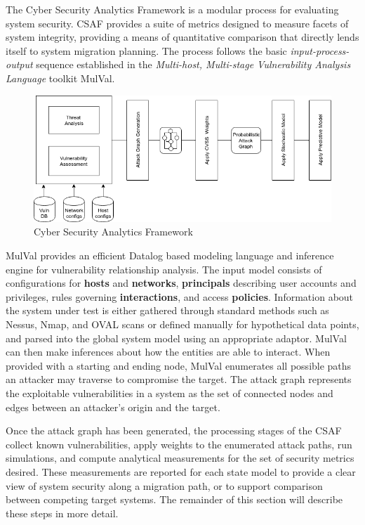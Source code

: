 
The Cyber Security Analytics Framework\cite{Abraham_2016} is a modular process for evaluating system security. CSAF provides a suite of metrics designed to measure facets of system integrity, providing a means of quantitative comparison that directly lends itself to system migration planning. The process follows the basic \textit{input-process-output} sequence established in the \textit{Multi-host, Multi-stage Vulnerability Analysis Language}\cite{Ou_Appel_2005} toolkit MulVal.

\begin{figure}[H]
\centering
\includegraphics[width=140mm]{resource/img/ch_background/sdn_analytics/CSAF_arch.png}
\caption{Cyber Security Analytics Framework\cite{Abraham_2016}}
\label{fig:csaf_framework}
\end{figure} 

MulVal provides an efficient\cite{Rao_1997} Datalog based modeling language and inference engine for vulnerability relationship analysis. The input model consists of configurations for \textbf{hosts} and \textbf{networks}, \textbf{principals} describing user accounts and privileges, rules governing \textbf{interactions}, and access \textbf{policies}. Information about the system under test is either gathered through standard methods\cite{Ou_Govindavajhala_Appel} such as Nessus, Nmap, and OVAL scans or defined manually for hypothetical data points, and parsed into the global system model using an appropriate adaptor. MulVal can then make inferences about how the entities are able to interact. When provided with a starting and ending node, MulVal enumerates all possible paths an attacker may traverse to compromise the target. The attack graph represents the exploitable vulnerabilities in a system as the set of connected nodes and edges between an attacker’s origin and the target.

Once the attack graph has been generated, the processing stages of the CSAF collect known vulnerabilities, apply weights to the enumerated attack paths, run simulations, and compute analytical measurements for the set of security metrics desired. These measurements are reported for each state model to provide a clear view of system security along a migration path, or to support comparison between competing target systems. The remainder of this section will describe these steps in more detail. %

